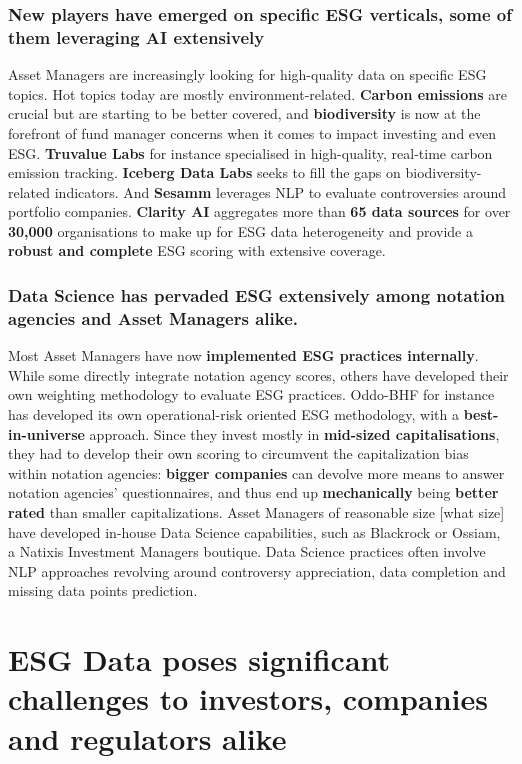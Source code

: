 \documentclass[12pt]{report}
\begin{document}
\subsubsection{New players have emerged on specific ESG verticals, some of them leveraging AI extensively }

Asset Managers are increasingly looking for high-quality data on specific ESG topics. Hot topics today are mostly environment-related. \textbf{Carbon emissions} are crucial but are starting to be better covered, and \textbf{biodiversity} is now at the forefront of fund manager concerns when it comes to impact investing and even ESG. \textbf{Truvalue Labs} for instance specialised in high-quality, real-time carbon emission tracking. \textbf{Iceberg Data Labs} seeks to fill the gaps on biodiversity-related indicators. And \textbf{Sesamm} leverages NLP to evaluate controversies around portfolio companies. 
\textbf{Clarity AI} aggregates more than \textbf{65 data sources} for over \textbf{30,000} organisations to make up for ESG data heterogeneity and provide a \textbf{robust and complete} ESG scoring with extensive coverage. 

\subsubsection{Data Science has pervaded ESG extensively among notation agencies and Asset Managers alike.}

Most Asset Managers have now \textbf{implemented ESG practices internally}. While some directly integrate notation agency scores, others have developed their own weighting methodology to evaluate ESG practices. Oddo-BHF for instance has developed its own operational-risk oriented ESG methodology, with a \textbf{best-in-universe} approach. Since they invest mostly in \textbf{mid-sized capitalisations}, they had to develop their own scoring to circumvent the capitalization bias within notation agencies: \textbf{bigger companies} can devolve more means to answer notation agencies' questionnaires, and thus end up \textbf{mechanically} being \textbf{better rated} than smaller capitalizations. 
Asset Managers of reasonable size [what size] have developed in-house Data Science capabilities, such as Blackrock or Ossiam, a Natixis Investment Managers boutique. Data Science practices often involve NLP approaches revolving around controversy appreciation, data completion and missing data points prediction. 

\section{ESG Data poses significant challenges to investors, companies and regulators alike}
\end{document}
